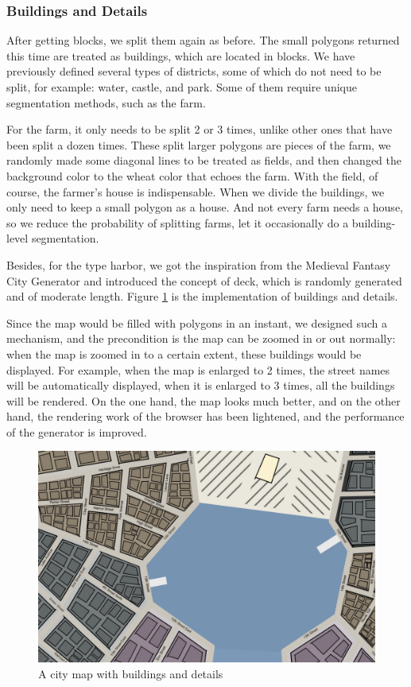 \subsubsection{Buildings and Details}
After getting blocks, we split them again as before. The small polygons returned this time are treated as buildings, which are located in blocks. We have previously defined several types of districts, some of which do not need to be split, for example: water, castle, and park. Some of them require unique segmentation methods, such as the farm.

For the farm, it only needs to be split 2 or 3 times, unlike other ones that have been split a dozen times. These split larger polygons are pieces of the farm, we randomly made some diagonal lines to be treated as fields, and then changed the background color to the wheat color that echoes the farm. With the field, of course, the farmer’s house is indispensable. When we divide the buildings, we only need to keep a small polygon as a house. And not every farm needs a house, so we reduce the probability of splitting farms, let it occasionally do a building-level segmentation.

Besides, for the type harbor, we got the inspiration from the Medieval Fantasy City Generator and introduced the concept of deck, which is randomly generated and of moderate length. Figure \ref{fig:buildings} is the implementation of buildings and details.

Since the map would be filled with polygons in an instant, we designed such a mechanism, and the precondition is the map can be zoomed in or out normally: when the map is zoomed in to a certain extent, these buildings would be displayed. For example, when the map is enlarged to 2 times, the street names will be automatically displayed, when it is enlarged to 3 times, all the buildings will be rendered. On the one hand, the map looks much better, and on the other hand, the rendering work of the browser has been lightened, and the performance of the generator is improved.


\begin{figure}[htbp]
  \includegraphics[width=\textwidth]{section04/assets/Map-details.png}
  \caption{A city map with buildings and details}
  \label{fig:buildings}
\end{figure}
